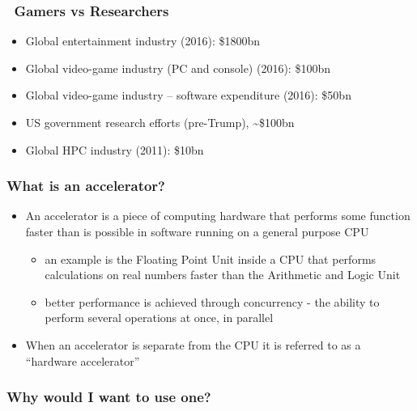 \subsubsection{~Gamers vs Researchers}\label{gamers-vs-researchers}

\begin{itemize}
\itemsep1pt\parskip0pt
\item
  Global entertainment industry (2016): \$1800bn
\item
  Global video-game industry (PC and console) (2016): \$100bn
\item
  Global video-game industry -- software expenditure (2016): \$50bn
\item
  US government research efforts (pre-Trump), \textasciitilde{}\$100bn
\item
  Global HPC industry (2011): \$10bn
\end{itemize}

\subsubsection{What is an accelerator?}\label{what-is-an-accelerator}

\begin{itemize}
\itemsep1pt\parskip0pt
\item
  An accelerator is a piece of computing hardware that performs some
  function faster than is possible in software running on a general
  purpose CPU

  \begin{itemize}
  \itemsep1pt\parskip0pt
  \item
    an example is the Floating Point Unit inside a CPU that performs
    calculations on real numbers faster than the Arithmetic and Logic
    Unit
  \item
    better performance is achieved through concurrency - the ability to
    perform several operations at once, in parallel
  \end{itemize}
\item
  When an accelerator is separate from the CPU it is referred to as a
  ``hardware accelerator''
\end{itemize}

\subsubsection{Why would I want to use
one?}\label{why-would-i-want-to-use-one}

